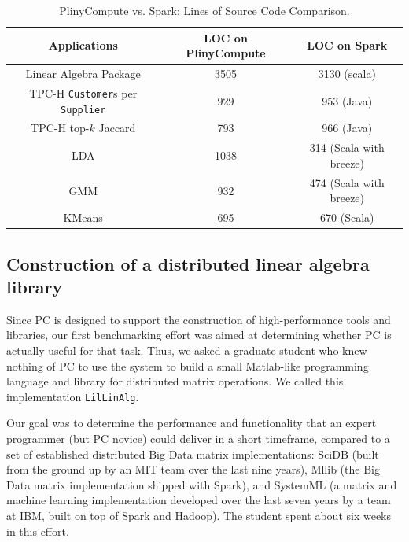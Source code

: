 \begin{table}[h!]
\begin{center}
\begin{tabular}{|c|c|c|}
\hline
Applications & LOC on PlinyCompute & LOC on Spark\\
\hline
Linear Algebra Package &3505& 3130 (scala)\\
TPC-H \texttt{Customer}s per \texttt{Supplier}&929 &953 (Java)\\
TPC-H top-$k$ Jaccard &793 & 966 (Java)\\
LDA &1038  &314 (Scala with breeze)\\
GMM&932 & 474 (Scala with breeze)\\
KMeans &695  &670 (Scala)\\
\hline
\end{tabular}
\caption{PlinyCompute vs. Spark: Lines of Source Code Comparison.}
\label{fig:LOC}
\end{center}
\end{table}





\subsection {Construction of a distributed linear algebra library}
Since PC is designed to support the construction
of high-performance tools and libraries, our first benchmarking effort was aimed at determining 
whether PC is actually useful for that task.  Thus, we asked
a graduate student who knew nothing of PC to use the system to build a small Matlab-like 
programming language and library for distributed matrix operations.
We called this implementation \texttt{LilLinAlg}.

Our goal was to determine the 
performance and functionality that an expert programmer (but PC novice) could deliver in a short
timeframe, compared to a set of established distributed Big Data matrix implementations:
SciDB \cite{brown2010overview, stonebraker2011architecture} (built from the ground up by an MIT team over the last nine years), Mllib \cite{meng2016mllib} 
(the Big Data matrix
implementation shipped with Spark), and SystemML \cite{boehm2014hybrid, ghoting2011systemml, boehm2016systemml}
(a matrix and machine learning implementation developed
over the last seven years by a team at IBM, built on top of Spark and Hadoop).
The student spent about six weeks in this effort.

